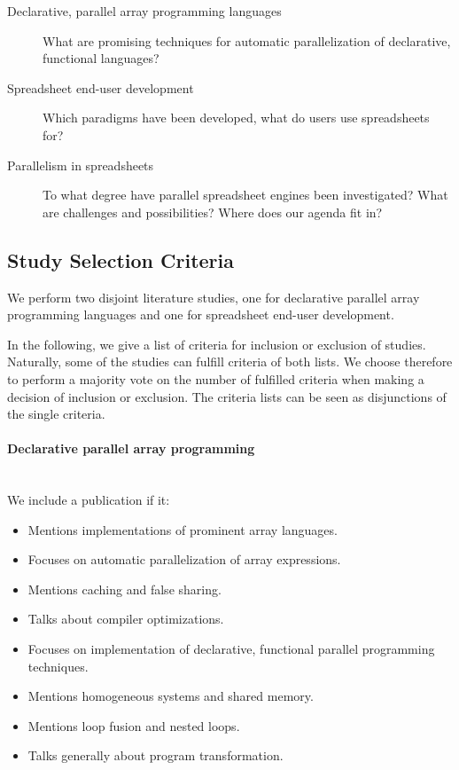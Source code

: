 \documentclass[a4paper]{article}
\begin{document}
\begin{description}
\item[Declarative, parallel array programming languages] What are
  promising techniques for automatic parallelization of declarative,
  functional languages?
\item[Spreadsheet end-user development] Which paradigms have been
  developed, what do users use spreadsheets for?
\item[Parallelism in spreadsheets] To what degree have parallel
  spreadsheet engines been investigated? What are challenges and
  possibilities? Where does our agenda fit in?
\end{description}

\subsection{Study Selection Criteria}
\label{sec:study-select-crit}

We perform two disjoint literature studies, one for declarative
parallel array programming languages and one for spreadsheet end-user
development.

In the following, we give a list of criteria for inclusion or
exclusion of studies. Naturally, some of the studies can fulfill
criteria of both lists. We choose therefore to perform a majority vote
on the number of fulfilled criteria when making a decision of
inclusion or exclusion. The criteria lists can be seen as disjunctions
of the single criteria.

\paragraph{Declarative parallel array programming}
~\\

We include a publication if it:

\begin{itemize}
\item Mentions implementations of prominent array languages.
\item Focuses on automatic parallelization of array expressions.
\item Mentions caching and false sharing.
\item Talks about compiler optimizations.
\item Focuses on implementation of declarative, functional parallel
  programming techniques.
\item Mentions homogeneous systems and shared memory.
\item Mentions loop fusion and nested loops.
\item Talks generally about program transformation.
\end{itemize}
\end{document}

